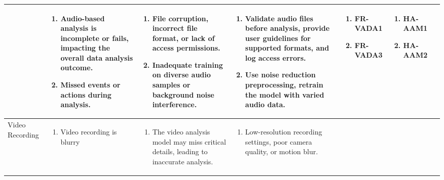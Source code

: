 \documentclass{article}
\begin{document}
\begin{landscape}
\begin{longtable}{|p{3cm}|p{3cm}|p{4cm}|p{4cm}|p{3cm}|p{2cm}|p{3cm}|}
\begin{enumerate}[leftmargin=*]
  \end{enumerate} & 
  \begin{enumerate}[leftmargin=*]
      \item Audio-based analysis is incomplete or fails, impacting the overall data analysis outcome.
      \item Missed events or actions during analysis.
  \end{enumerate} &
  \begin{enumerate}[leftmargin=*]
       \item File corruption, incorrect file format, or lack of access permissions.
       \item Inadequate training on diverse audio samples or background noise interference.
  \end{enumerate} &
  \begin{enumerate}[leftmargin=*]
       \item Validate audio files before analysis, provide user guidelines for supported formats, and log access errors.
       \item Use noise reduction preprocessing, retrain the model with varied audio data.
  \end{enumerate} &
  \begin{enumerate}[leftmargin=*]
       \item FR-VADA1
       \item FR-VADA3
  \end{enumerate} &
  \begin{enumerate}[leftmargin=*]
       \item HA-AAM1
       \item HA-AAM2
  \end{enumerate} \\
  \hline
  Video Recording & 
  \begin{enumerate}[leftmargin=*]
      \item Video recording is blurry
  \end{enumerate} & 
  \begin{enumerate}[leftmargin=*]
      \item The video analysis model may miss critical details, leading to inaccurate analysis.
  \end{enumerate} &
  \begin{enumerate}[leftmargin=*]
       \item Low-resolution recording settings, poor camera quality, or motion blur.
  \end{enumerate} &
  \begin{enumerate}[leftmargin=*]

\end{enumerate}
\end{longtable}
\end{landscape}
\end{document}
